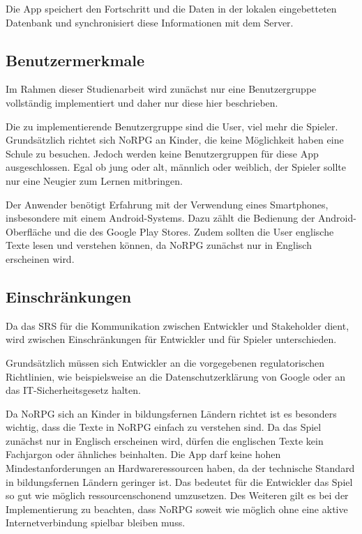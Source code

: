 		Die App speichert den Fortschritt und die Daten in der lokalen eingebetteten Datenbank und synchronisiert diese Informationen mit dem Server.
	
	\subsection{Benutzermerkmale}
		Im Rahmen dieser Studienarbeit wird zunächst nur eine Benutzergruppe vollständig implementiert und daher nur diese hier beschrieben.
		
		Die zu implementierende Benutzergruppe sind die User, viel mehr die Spieler. Grundsätzlich richtet sich NoRPG an Kinder, die keine Möglichkeit haben eine Schule zu besuchen. Jedoch werden keine Benutzergruppen für diese App ausgeschlossen. Egal ob jung oder alt, männlich oder weiblich, der Spieler sollte nur eine Neugier zum Lernen mitbringen. 
		
		Der Anwender benötigt Erfahrung mit der Verwendung eines Smartphones, insbesondere mit einem Android-Systems. Dazu zählt die Bedienung der Android-Oberfläche und die des Google Play Stores. Zudem sollten die User englische Texte lesen und verstehen können, da NoRPG zunächst nur in Englisch erscheinen wird.
			
	\subsection{Einschränkungen}
		Da das \ac{SRS} für die Kommunikation zwischen Entwickler und Stakeholder dient, wird zwischen Einschränkungen für Entwickler und für Spieler unterschieden.
		
		Grundsätzlich müssen sich Entwickler an die vorgegebenen regulatorischen Richtlinien, wie beispielsweise an die Datenschutzerklärung von Google oder an das IT-Sicherheitsgesetz halten.
		
		Da NoRPG sich an Kinder in bildungsfernen Ländern richtet ist es besonders wichtig, dass die Texte in NoRPG einfach zu verstehen sind. Da das Spiel zunächst nur in Englisch erscheinen wird, dürfen die englischen Texte kein Fachjargon oder ähnliches beinhalten. Die App darf keine hohen Mindestanforderungen an Hardwareressourcen haben, da der technische Standard in bildungsfernen Ländern geringer ist. Das bedeutet für die Entwickler das Spiel so gut wie möglich ressourcenschonend umzusetzen. Des Weiteren gilt es bei der Implementierung zu beachten, dass NoRPG soweit wie möglich ohne eine aktive Internetverbindung spielbar bleiben muss.
		
